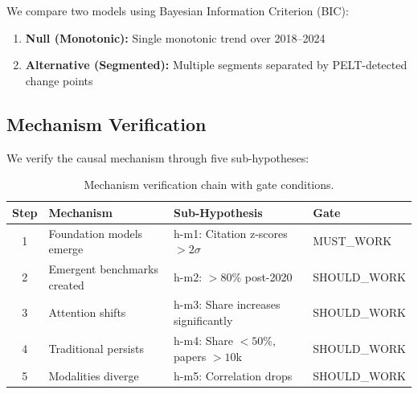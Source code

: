 We compare two models using Bayesian Information Criterion (BIC):
\begin{enumerate}
    \item \textbf{Null (Monotonic):} Single monotonic trend over 2018--2024
    \item \textbf{Alternative (Segmented):} Multiple segments separated by PELT-detected change points
\end{enumerate}

\subsection{Mechanism Verification}

We verify the causal mechanism through five sub-hypotheses:

\begin{table}[h]
\centering
\begin{tabular}{@{}clll@{}}
\toprule
Step & Mechanism & Sub-Hypothesis & Gate \\
\midrule
1 & Foundation models emerge & h-m1: Citation z-scores $>2\sigma$ & MUST\_WORK \\
2 & Emergent benchmarks created & h-m2: $>80\%$ post-2020 & SHOULD\_WORK \\
3 & Attention shifts & h-m3: Share increases significantly & SHOULD\_WORK \\
4 & Traditional persists & h-m4: Share $<50\%$, papers $>10$k & SHOULD\_WORK \\
5 & Modalities diverge & h-m5: Correlation drops & SHOULD\_WORK \\
\bottomrule
\end{tabular}
\caption{Mechanism verification chain with gate conditions.}
\label{tab:mechanism}
\end{table}
